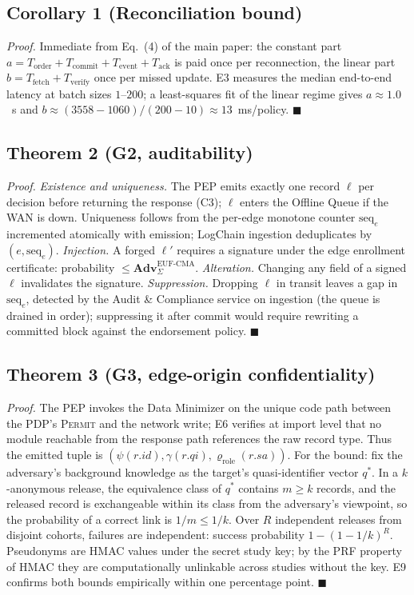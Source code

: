 \documentclass[runningheads]{llncs}
\begin{document}
\subsection*{Corollary 1 (Reconciliation bound)}
\emph{Proof.} Immediate from Eq.~(4) of the main paper: the constant part $a=T_{\mathrm{order}}+T_{\mathrm{commit}}+T_{\mathrm{event}}+T_{\mathrm{ack}}$ is paid once per reconnection, the linear part $b=T_{\mathrm{fetch}}+T_{\mathrm{verify}}$ once per missed update. E3 measures the median end-to-end latency at batch sizes $1$--$200$; a least-squares fit of the linear regime gives $a\approx 1.0$~s and $b\approx (3558-1060)/(200-10)\approx 13$~ms/policy. \hfill$\blacksquare$

\subsection*{Theorem 2 (G2, auditability)}
\emph{Proof.}
\emph{Existence and uniqueness.} The PEP emits exactly one record $\ell$ per decision before returning the response (C3); $\ell$ enters the Offline Queue if the WAN is down. Uniqueness follows from the per-edge monotone counter $\mathrm{seq}_e$ incremented atomically with emission; LogChain ingestion deduplicates by $(\mathit{e},\mathrm{seq}_e)$.
\emph{Injection.} A forged $\ell'$ requires a signature under the edge enrollment certificate: probability $\leq \mathbf{Adv}^{\mathrm{EUF\text{-}CMA}}_{\Sigma}$.
\emph{Alteration.} Changing any field of a signed $\ell$ invalidates the signature.
\emph{Suppression.} Dropping $\ell$ in transit leaves a gap in $\mathrm{seq}_e$, detected by the Audit \& Compliance service on ingestion (the queue is drained in order); suppressing it after commit would require rewriting a committed block against the endorsement policy. \hfill$\blacksquare$

\subsection*{Theorem 3 (G3, edge-origin confidentiality)}
\emph{Proof.}
The PEP invokes the Data Minimizer on the unique code path between the PDP's \textsc{Permit} and the network write; E6 verifies at import level that no module reachable from the response path references the raw record type. Thus the emitted tuple is $(\psi(r.\mathit{id}), \gamma(r.\mathit{qi}), \varrho_{\mathrm{role}}(r.\mathit{sa}))$.
For the bound: fix the adversary's background knowledge as the target's quasi-identifier vector $q^\ast$. In a $k$-anonymous release, the equivalence class of $q^\ast$ contains $m\geq k$ records, and the released record is exchangeable within its class from the adversary's viewpoint, so the probability of a correct link is $1/m\leq 1/k$. Over $R$ independent releases from disjoint cohorts, failures are independent: success probability $1-(1-1/k)^R$. Pseudonyms are HMAC values under the secret study key; by the PRF property of HMAC they are computationally unlinkable across studies without the key. E9 confirms both bounds empirically within one percentage point. \hfill$\blacksquare$
\end{document}
